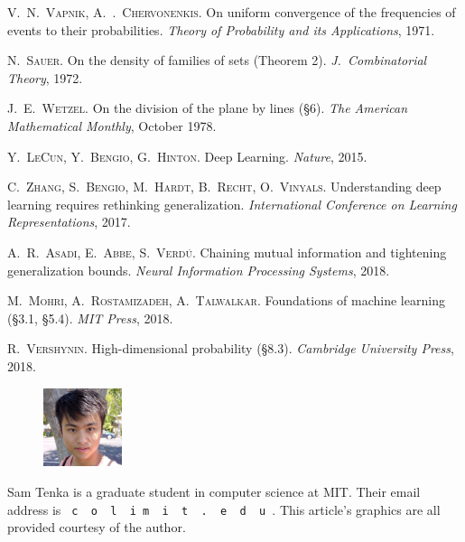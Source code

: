 \documentclass[twocolumn, 11pt]{article}
\theoremstyle{definition}
\begin{document}
        {
        \footnotesize
        \begin{thebibliography}{9}


            \textsc{V.\ N.\ Vapnik, A.\ .\ Chervonenkis}.
            On uniform convergence of the frequencies of events to their probabilities.
            \textit{Theory of Probability and its Applications}, 1971.

            \textsc{N.\ Sauer}.
            On the density of families of sets (Theorem 2).
            \textit{J.\ Combinatorial Theory}, 1972.

            \textsc{J.\ E.\ Wetzel}.
            On the division of the plane by lines (\S 6).
            \textit{The American Mathematical Monthly}, October 1978.

            \textsc{Y.\ LeCun, Y.\ Bengio, G.\ Hinton}.
            Deep Learning.
            \textit{Nature}, 2015.

            \textsc{C.\ Zhang, S.\ Bengio, M.\ Hardt, B.\ Recht, O.\ Vinyals}.
            Understanding deep learning requires rethinking generalization.
            \textit{International Conference on Learning Representations}, 2017.

            \textsc{A.\ R.\ Asadi, E.\ Abbe, S.\ Verd\'u}.
            Chaining mutual information and tightening generalization bounds.
            \textit{Neural Information Processing Systems}, 2018.

            \textsc{M.\ Mohri, A.\ Rostamizadeh, A.\ Talwalkar}.
            Foundations of machine learning (\S 3.1, \S 5.4).
            \textit{MIT Press}, 2018.

            \textsc{R.\ Vershynin}.
            High-dimensional probability (\S 8.3).
            \textit{Cambridge University Press}, 2018.

        \end{thebibliography}
        }

        \hrulefill
        \vspace{0.1cm}
            \begin{figure}
                \vspace{-0.4cm}
                    \includegraphics[height=2.3cm]{sam}
            \end{figure}
        \normalsize
        Sam Tenka is a graduate student in computer science at MIT.  Their
        email address is
        \texttt{
            c{\tiny\ }%
            o{\tiny\ }%
            l{\tiny\ }%
            i{\tiny@}%
            m{\tiny\ }%
            i{\tiny\ }%
            t{\tiny\ }%
            .{\tiny\ }%
            e{\tiny\ }%
            d{\tiny\ }%
            u%
        }.  This article's graphics are all provided courtesy of the author.
\end{document}
